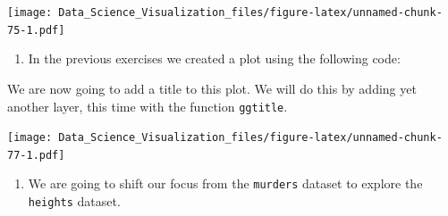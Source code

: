 \documentclass[
]{article}
\newenvironment{Shaded}{\begin{snugshade}}{\end{snugshade}}
\newcommand{\CommentTok}[1]{\textcolor[rgb]{0.56,0.35,0.01}{\textit{#1}}}
\newcommand{\DataTypeTok}[1]{\textcolor[rgb]{0.13,0.29,0.53}{#1}}
\newcommand{\KeywordTok}[1]{\textcolor[rgb]{0.13,0.29,0.53}{\textbf{#1}}}
\newcommand{\NormalTok}[1]{#1}
\newcommand{\OperatorTok}[1]{\textcolor[rgb]{0.81,0.36,0.00}{\textbf{#1}}}
\newcommand{\StringTok}[1]{\textcolor[rgb]{0.31,0.60,0.02}{#1}}
\providecommand{\tightlist}{%
  \setlength{\itemsep}{0pt}\setlength{\parskip}{0pt}}
\begin{document}
\texttt{[image: Data\_Science\_Visualization\_files/figure-latex/unnamed-chunk-75-1.pdf]}

\begin{enumerate}
\def\labelenumi{\arabic{enumi}.}
\setcounter{enumi}{13}
\tightlist
\item
  In the previous exercises we created a plot using the following code:
\end{enumerate}

\begin{Shaded}
\end{Shaded}

We are now going to add a title to this plot. We will do this by adding
yet another layer, this time with the function \texttt{ggtitle}.

\begin{Shaded}
\end{Shaded}

\texttt{[image: Data\_Science\_Visualization\_files/figure-latex/unnamed-chunk-77-1.pdf]}

\begin{enumerate}
\def\labelenumi{\arabic{enumi}.}
\setcounter{enumi}{14}
\tightlist
\item
  We are going to shift our focus from the \texttt{murders} dataset to
  explore the \texttt{heights} dataset.
\end{enumerate}
\end{document}
